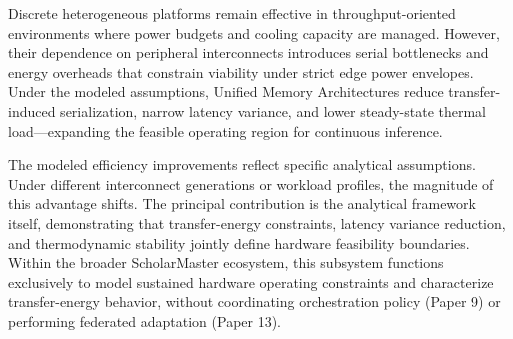 \documentclass[conference]{IEEEtran}
\begin{document}
Discrete heterogeneous platforms remain effective in throughput-oriented environments where power budgets and cooling capacity are managed. However, their dependence on peripheral interconnects introduces serial bottlenecks and energy overheads that constrain viability under strict edge power envelopes. Under the modeled assumptions, Unified Memory Architectures reduce transfer-induced serialization, narrow latency variance, and lower steady-state thermal load---expanding the feasible operating region for continuous inference.

The modeled efficiency improvements reflect specific analytical assumptions. Under different interconnect generations or workload profiles, the magnitude of this advantage shifts. The principal contribution is the analytical framework itself, demonstrating that transfer-energy constraints, latency variance reduction, and thermodynamic stability jointly define hardware feasibility boundaries. Within the broader ScholarMaster ecosystem, this subsystem functions exclusively to model sustained hardware operating constraints and characterize transfer-energy behavior, without coordinating orchestration policy (Paper 9) or performing federated adaptation (Paper 13).
\end{document}
